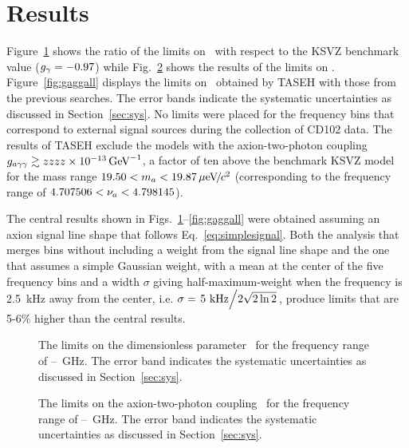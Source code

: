 \section{Results} \label{sec:results}
Figure~\ref{fig:glimit} shows the ratio of the limits on \ggamma\ with respect 
to the KSVZ benchmark value ($g_{\gamma}=-0.97$) while Fig.~\ref{fig:gagglimit} 
shows the results of the limits on \gagg. Figure~\ref{fig:gaggall} displays 
the limits on \gagg\ obtained by TASEH with those from the previous searches. 
The error bands indicate the systematic uncertainties as discussed in 
Section~\ref{sec:sys}. No limits were placed for the frequency bins 
that correspond to external signal sources during the collection of CD102 
data. The results of TASEH exclude the models with the axion-two-photon
coupling $g_{a\gamma\gamma}\gtrsim zzzz\times 10^{-13}\,\text{Ge\hspace{-.08em}V}^{-1}$, a factor of ten above the benchmark
KSVZ model for the mass range $19.50 < m_a < 19.87 \,\mu\text{e\hspace{-.08em}V\hspace{-0.16em}/\hspace{-0.08em}}c^2$ (corresponding to 
the frequency range of $4.707506 < \nu_a < 4.798145$). 

The central results shown in Figs.~\ref{fig:glimit}--\ref{fig:gaggall} were 
obtained assuming an axion signal line shape that follows 
Eq.~\ref{eq:simplesignal}. Both the analysis that merges bins without including
 a weight from the signal line shape and the one 
that assumes a simple Gaussian weight, with a mean at the center of the five 
frequency bins and a width $\sigma$ 
giving half-maximum-weight when the frequency 
is 2.5~kHz away from the center, i.e. 
$\sigma=\left.5~\text{kHz}\middle/2\sqrt{2\ln2}\right.$, produce limits that 
are 5-6\% higher than the central results. 

\begin{figure} [htbp]
  \centering
  \caption{The limits on the dimensionless parameter \ggamma\ for the 
frequency range of \flo--\fhi~GHz. The error band indicates the systematic 
  uncertainties as discussed in Section~\ref{sec:sys}. }
  \label{fig:glimit}
\end{figure}

\begin{figure} [htbp]
  \centering
  \caption{The limits on the axion-two-photon coupling \gagg\ for the frequency 
range of \flo--\fhi~GHz. The error band indicates the systematic 
  uncertainties as discussed in Section~\ref{sec:sys}. }
  \label{fig:gagglimit}
\end{figure}


